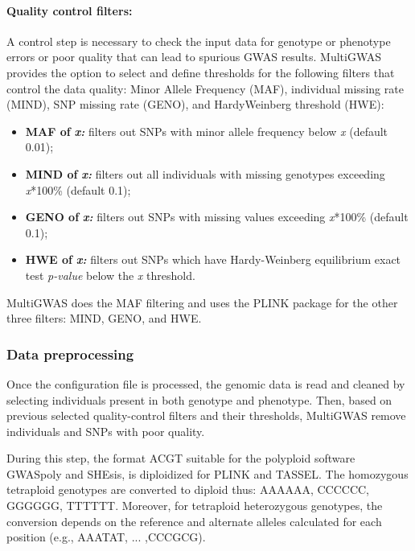 \documentclass{article}
\begin{document}
\paragraph{Quality control filters:}
A control step is necessary to check the input data for genotype or phenotype errors or poor quality that can lead to spurious GWAS results. MultiGWAS provides the option to select and define thresholds for the following filters that control the data quality: Minor Allele Frequency (MAF), individual missing rate (MIND), SNP missing rate (GENO), and Hardy\-Weinberg threshold (HWE):
\begin{itemize}
\item \textbf{MAF of }\textbf{\emph{x:}} filters out SNPs with minor allele frequency below \emph{x} (default 0.01); 
\item \textbf{MIND of }\textbf{\emph{x:}} filters out all individuals with missing genotypes exceeding \emph{x}{*}100\% (default 0.1); 
\item \textbf{GENO of }\textbf{\emph{x:}} filters out SNPs with missing values exceeding \emph{x}{*}100\% (default 0.1); 
\item \textbf{HWE of }\textbf{\emph{x:}} filters out SNPs which have Hardy-Weinberg equilibrium exact test \emph{p-value} below the \emph{x} threshold.
\end{itemize}
MultiGWAS does the MAF filtering and uses the PLINK package \cite{Gumpinger2018} for the other three filters: MIND, GENO, and HWE. 

\subsubsection{Data preprocessing}
Once the configuration file is processed, the genomic data is read and cleaned by selecting individuals present in both genotype and phenotype. Then, based on previous selected quality-control filters and their thresholds, MultiGWAS remove individuals and SNPs with poor quality.

During this step, the format \textquotedbl{}ACGT\textquotedbl{} suitable for the polyploid software GWASpoly and SHEsis, is \textquotedbl{}diploidized\textquotedbl{} for PLINK and TASSEL. The homozygous tetraploid genotypes are converted to diploid thus: AAAA\textrightarrow AA, CCCC\textrightarrow CC, GGGG\textrightarrow GG, TTTT\textrightarrow TT. Moreover, for tetraploid heterozygous genotypes, the conversion depends on the reference and alternate alleles calculated for each position (e.g., AAAT\textrightarrow AT, ... ,CCCG\textrightarrow CG). 
\end{document}
